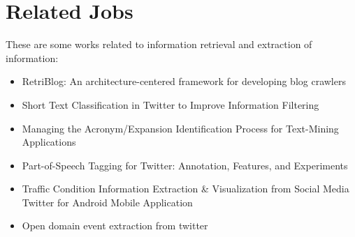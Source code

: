 \documentclass[12pt]{article}
\begin{document}
\section{Related Jobs}
These are some works related to information retrieval and extraction of information:
\begin{itemize}
\item RetriBlog: An architecture-centered framework for developing blog crawlers \cite{Ferreira:13}
\item Short Text Classification in Twitter to Improve Information Filtering \cite{Sriram:10}
\item Managing the Acronym/Expansion Identification Process for Text-Mining Applications \cite{Roche:08} 
\item Part-of-Speech Tagging for Twitter: Annotation, Features, and Experiments \cite{Gimpel:11}
\item Traffic Condition Information Extraction & Visualization from Social Media Twitter for Android Mobile Application \cite{Endarnoto:11}
\item Open domain event extraction from twitter \cite{Ritter:12}
\end{itemize}



\end{document}
